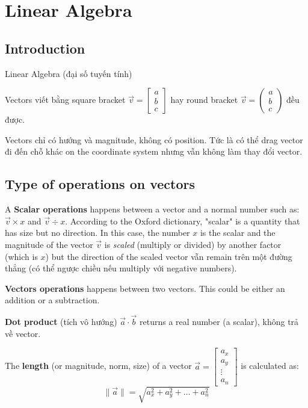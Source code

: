 \chapter{Linear Algebra}

\section{Introduction}

Linear Algebra (đại số tuyến tính)

Vectors viết bằng square bracket $\vec{v}=\begin{bmatrix}
a\\b\\c
\end{bmatrix}$ hay round bracket $\vec{v}=\begin{pmatrix}
a\\b\\c
\end{pmatrix}$ đều được.

Vectors chỉ có hướng và magnitude, không có position. Tức là có thể drag vector đi đến chỗ khác on the coordinate system nhưng vẫn không làm thay đổi vector.

\section{Type of operations on vectors}

A \textbf{Scalar operations} happens between a vector and a normal number such as: $\vec{v} \times x$ and $\vec{v} \div x$. According to the Oxford dictionary, "scalar" is a quantity that has size but no direction. In this case, the number $x$ is the scalar and the magnitude of the vector $\vec{v}$ is \textit{scaled} (multiply or divided) by another factor (which is $x$) but the direction of the scaled vector vẫn remain trên một đường thẳng (có thể ngược chiều nếu multiply với negative numbers).

\textbf{Vectors operations} happens between two vectors. This could be either an addition or a subtraction.

\textbf{Dot product} (tích vô hướng) $\vec{a} \cdot \vec{b}$ returns a real number (a scalar), không trả về vector.

The \textbf{length} (or magnitude, norm, size) of a vector $\vec{a}=\begin{bmatrix}
a_x\\
a_y\\
\vdots\\
a_n
\end{bmatrix}$ is calculated as: $$\| \vec{a} \| =\sqrt{a_x^2 + a_y^2 + \dots + a_n^2}$$

